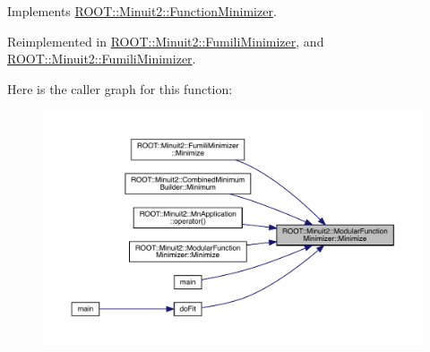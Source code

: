 Implements \mbox{\hyperlink{classROOT_1_1Minuit2_1_1FunctionMinimizer_aa664d755554be28f42be8270b8c35139}{R\+O\+O\+T\+::\+Minuit2\+::\+Function\+Minimizer}}.



Reimplemented in \mbox{\hyperlink{classROOT_1_1Minuit2_1_1FumiliMinimizer_ab9ec6dd4a0e664db7d23a3ea3b0a3c75}{R\+O\+O\+T\+::\+Minuit2\+::\+Fumili\+Minimizer}}, and \mbox{\hyperlink{classROOT_1_1Minuit2_1_1FumiliMinimizer_ab9ec6dd4a0e664db7d23a3ea3b0a3c75}{R\+O\+O\+T\+::\+Minuit2\+::\+Fumili\+Minimizer}}.

Here is the caller graph for this function\+:\nopagebreak
\begin{figure}[H]
\begin{center}
\leavevmode
\includegraphics[width=350pt]{d3/dc8/classROOT_1_1Minuit2_1_1ModularFunctionMinimizer_a8cbcb596782a34f43e4ce1c48865d0b7_icgraph}
\end{center}
\end{figure}
\mbox{\label{classROOT_1_1Minuit2_1_1ModularFunctionMinimizer_a0a881c0e1c53c2144c437cfb18f1971e}} 
